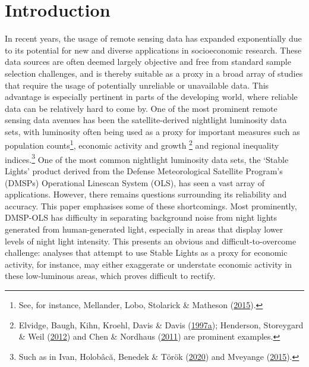 \documentclass[11pt,preprint, authoryear]{elsarticle}
\numberwithin{equation}{section}
\numberwithin{figure}{section}
\numberwithin{table}{section}
\let\rmarkdownfootnote\footnote%
\def\footnote{\protect\rmarkdownfootnote}
\begin{document}
\pagestyle{fancy}
\chead{}
\lfoot{}
\lhead{}
\cfoot{}


\headsep 35pt %




\hypertarget{introduction}{%
\section{\texorpdfstring{Introduction
\label{Introduction}}{Introduction }}\label{introduction}}

In recent years, the usage of remote sensing data has expanded
exponentially due to its potential for new and diverse applications in
socioeconomic research. These data sources are often deemed largely
objective and free from standard sample selection challenges, and is
thereby suitable as a proxy in a broad array of studies that require the
usage of potentially unreliable or unavailable data. This advantage is
especially pertinent in parts of the developing world, where reliable
data can be relatively hard to come by. One of the most prominent remote
sensing data avenues has been the satellite-derived nightlight
luminosity data sets, with luminosity often being used as a proxy for
important measures such as population counts\footnote{See, for instance,
  Mellander, Lobo, Stolarick \& Matheson
  (\protect\hyperlink{ref-mellander2015night}{2015}).}, economic
activity and growth \footnote{Elvidge, Baugh, Kihn, Kroehl, Davis \&
  Davis (\protect\hyperlink{ref-elvidge1997}{1997a}); Henderson,
  Storeygard \& Weil (\protect\hyperlink{ref-henderson2012}{2012}) and
  Chen \& Nordhaus (\protect\hyperlink{ref-chen2011}{2011}) are
  prominent examples.} and regional inequality indices.\footnote{Such as
  in Ivan, Holobâcă, Benedek \& Török
  (\protect\hyperlink{ref-ivan2020nlinequality}{2020}) and Mveyange
  (\protect\hyperlink{ref-mveyange2015}{2015}).} One of the most common
nightlight luminosity data sets, the `Stable Lights' product derived
from the Defense Meteorological Satellite Program's (DMSPs) Operational
Linescan System (OLS), has seen a vast array of applications. However,
there remains questions surrounding its reliability and accuracy. This
paper emphasises some of these shortcomings. Most prominently, DMSP-OLS
has difficulty in separating background noise from night lights
generated from human-generated light, especially in areas that display
lower levels of night light intensity. This presents an obvious and
difficult-to-overcome challenge: analyses that attempt to use Stable
Lights as a proxy for economic activity, for instance, may either
exaggerate or understate economic activity in these low-luminous areas,
which proves difficult to rectify.
\end{document}
